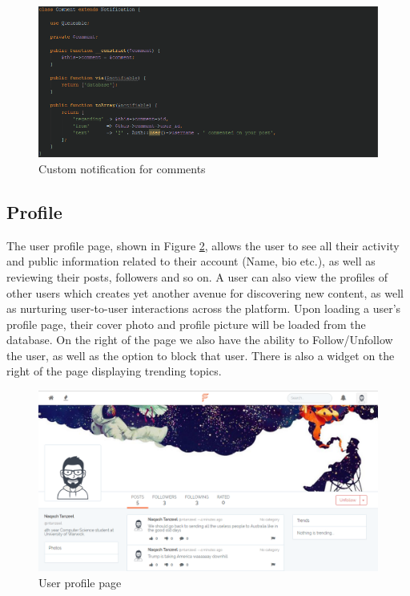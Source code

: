 \begin{figure}[H]
\centering
\includegraphics[width=\textwidth]{Images/Implementation/CommentNotification}
\caption{Custom notification for comments}
\label{fig:CommentNotification}
\end{figure}

\subsection{Profile}
The user profile page, shown in Figure \ref{fig:ProfilePage}, allows the user to see all their activity and public information related to their account (Name, bio etc.), as well as reviewing their posts, followers and so on. A user can also view the profiles of other users which creates yet another avenue for discovering new content, as well as nurturing user-to-user interactions across the platform. Upon loading a user's profile page, their cover photo and profile picture will be loaded from the database. On the right of the page we also have the ability to Follow/Unfollow the user, as well as the option to block that user. There is also a widget on the right of the page displaying trending topics.

\begin{figure}[H]
\centering
\includegraphics[width=\textwidth]{Images/Implementation/ProfilePage}
\caption{User profile page}
\label{fig:ProfilePage}
\end{figure}

